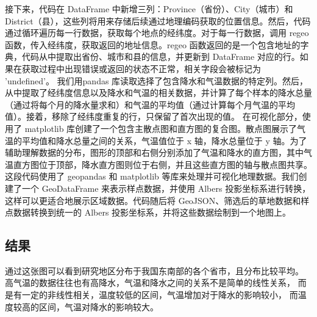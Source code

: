 \documentclass[AutoFakeBold]{LZUThesis-PgD&PhD}
\begin{document}
	接下来，代码在 DataFrame 中新增三列：Province（省份）、City（城市）和 District（县），这些列将用来存储后续通过地理编码获取的位置信息。然后，代码通过循环遍历每一行数据，获取每个地点的经纬度。对于每一行数据，调用 regeo 函数，传入经纬度，获取返回的地址信息。regeo 函数返回的是一个包含地址的字典，代码从中提取出省份、城市和县的信息，并更新到 DataFrame 对应的行。如果在获取过程中出现错误或返回的状态不正常，相关字段会被标记为 'undefined'。
	我们用pandas 库读取选择了包含降水和气温数据的特定列。然后，从中提取了经纬度信息以及降水和气温的相关数据，并计算了每个样本的降水总量（通过将每个月的降水量求和）和气温的平均值（通过计算每个月气温的平均值）。接着，移除了经纬度重复的行，只保留了首次出现的值。
	在可视化部分，使用了 matplotlib 库创建了一个包含主散点图和直方图的复合图。散点图展示了气温的平均值和降水总量之间的关系，气温值位于 x 轴，降水总量位于 y 轴。为了辅助理解数据的分布，图形的顶部和右侧分别添加了气温和降水的直方图，其中气温直方图位于顶部，降水直方图则位于右侧，并且这些直方图的轴与散点图共享。
	这段代码使用了 geopandas 和 matplotlib 等库来处理并可视化地理数据。我们创建了一个 GeoDataFrame 来表示样点数据，并使用 Albers 投影坐标系进行转换，这样可以更适合地展示区域数据。代码随后将 GeoJSON、筛选后的草地数据和样点数据转换到统一的 Albers 投影坐标系，并将这些数据绘制到一个地图上。
	
	\subsection{结果}
	
	通过这张图可以看到研究地区分布于我国东南部的各个省市，且分布比较平均。
	高气温的数据往往也有高降水，气温和降水之间的关系不是简单的线性关系，
	而是有一定的非线性相关，温度较低的区间，气温增加对于降水的影响较小，
	而温度较高的区间，气温对降水的影响较大。
	
	
	
\end{document}
